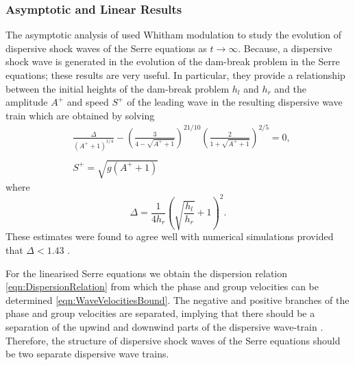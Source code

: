 \subsubsection{Asymptotic and Linear Results}
The asymptotic analysis of \citet{El-etal-2006} used Whitham modulation to study the evolution of dispersive shock waves of the Serre equations as $t\rightarrow \infty$. Because, a dispersive shock wave is generated in the evolution of the dam-break problem in the Serre equations; these results are very useful. In particular, they provide a relationship between the initial heights of the dam-break problem $h_l$ and $h_r$ and the amplitude $A^+$ and speed $S^+$ of the leading wave in the resulting dispersive wave train which are obtained by solving
\begin{subequations}
	\begin{align}
	&\frac{\Delta}{\left(A^+ + 1\right)^{1/4}} - \left(\frac{3}{4 -  \sqrt{A^+ + 1}}\right)^{21/10} \left(\frac{2}{1 + \sqrt{A^+ + 1}}\right)^{2/5} = 0,	\label{eqn:Aplusdef} \\  \nonumber \\
	&S^+ = \sqrt{g \left(A^+ + 1\right)}	\label{eqn:Splusdef}
	\end{align}
	\label{eqn:ELWhitMod}	
\end{subequations}
where
\begin{equation*}
\Delta = \frac{1}{4 h_r}\left(\sqrt{\dfrac{h_l}{h_r}} + 1\right)^2.
\end{equation*}
These estimates were found to agree well with numerical simulations provided that $\Delta < 1.43$ \cite{El-etal-2006}.

For the linearised Serre equations we obtain the dispersion relation \eqref{eqn:DispersionRelation} from which the phase and group velocities can be determined \eqref{eqn:WaveVelocitiesBound}. The negative and positive branches of the phase and group velocities are separated, implying that there should be a separation of the upwind and downwind parts of the dispersive wave-train \cite{Dougalis-etal-2007}. Therefore, the structure of dispersive shock waves of the Serre equations should be two separate dispersive wave trains.


